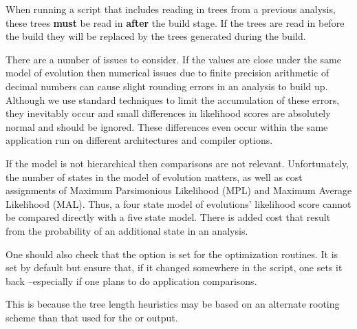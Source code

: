 {When running a script that includes reading in trees from a previous analysis, these trees {\bf must} be read 
in {\bf after} the build stage.  If the trees are read in before the build they will be replaced by the trees 
generated during the build.}

{There are a number of issues to consider. If the values are close under the same model of
evolution then numerical issues due to finite precision arithmetic of decimal numbers can cause
slight rounding errors in an analysis to build up. Although we use standard techniques to limit the
accumulation of these errors, they inevitably occur and small differences in likelihood scores are
absolutely normal and should be ignored. These differences even occur within the same application
run on different architectures and compiler options.

If the model is not hierarchical then comparisons are not relevant. Unfortunately, the number of
states in the model of evolution matters, as well as cost assignments of Maximum Parsimonious
Likelihood (MPL) and Maximum Average Likelihood (MAL). Thus, a four state model of evolutions'
likelihood score cannot be compared directly with a five state model. There is added cost that
result from the probability of an additional state in an analysis. 

One should also check that the  option is set for the optimization routines.
It is set by default but ensure that, if it changed somewhere in the script, one sets it back
--especially if one plans to do application comparisons.}

{This is because the tree length heuristics may be based on an alternate rooting scheme than that 
used for the  or  output.}
